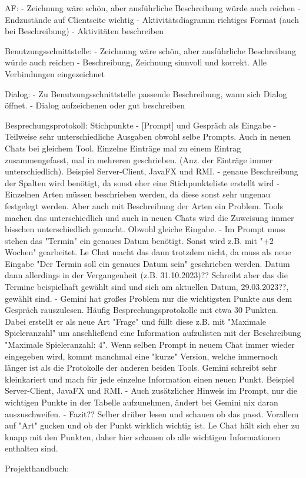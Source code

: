             AF:
            - Zeichnung wäre schön, aber ausführliche Beschreibung würde auch reichen
            - Endzustände auf Clientseite wichtig
            - Aktivitätsdiagramm richtiges Format (auch bei Beschreibung)
            - Aktivitäten beschreiben
        
            Benutzungsschnittstelle:
            - Zeichnung wäre schön, aber ausführliche Beschreibung würde auch reichen
            - Beschreibung, Zeichnung sinnvoll und korrekt. Alle Verbindungen eingezeichnet
        
            Dialog:
            - Zu Benutzungsschnittstelle passende Beschreibung, wann sich Dialog öffnet.
            - Dialog aufzeichenen oder gut beschreiben
    
    
    Besprechungsprotokoll:
        Stichpunkte
        - [Prompt] und Gespräch als Eingabe
        - Teilweise sehr unterschiedliche Ausgaben obwohl selbe Prompts. Auch in neuen Chats bei gleichem Tool.
        Einzelne Einträge mal zu einem Eintrag zusammengefasst, mal in mehreren geschrieben. (Anz. der Einträge immer unterschiedlich).
        Beispiel Server-Client, JavaFX und RMI.
        - genaue Beschreibung der Spalten wird benötigt, da sonst eher eine Stichpunkteliste erstellt wird
        - Einzelnen Arten müssen beschrieben werden, da diese sonst sehr ungenau festgelegt werden. Aber auch mit
        Beschreibung der Arten ein Problem. Tools machen das unterschiedlich und auch in neuen Chats wird die Zuweisung immer 
        bisschen unterschiedlich gemacht. Obwohl gleiche Eingabe.
        - Im Prompt muss stehen das "Termin" ein genaues Datum benötigt. Sonst wird z.B. mit "+2 Wochen" gearbeitet. Le Chat 
        macht das dann trotzdem nicht, da muss als neue Eingabe "Der Termin soll ein genaues Datum sein" geschrieben werden.
        Datum dann allerdings in der Vergangenheit (z.B. 31.10.2023)?? Schreibt aber das die Termine beispielhaft gewählt sind
        und sich am aktuellen Datum, 29.03.2023??, gewählt sind.
        - Gemini hat großes Problem nur die wichtigsten Punkte aus dem Gespräch rauszulesen. Häufig Besprechungsprotokolle mit etwa 
        30 Punkten. Dabei erstellt er als neue Art "Frage" und füllt diese z.B. mit "Maximale Spieleranzahl" um anschließend eine 
        Information aufzulisten mit der Beschreibung "Maximale Spieleranzahl: 4". Wenn selben Prompt in neuem Chat immer wieder 
        eingegeben wird, kommt manchmal eine "kurze" Version, welche immernoch länger ist als die Protokolle der anderen beiden Tools.
        Gemini schreibt sehr kleinkariert und mach für jede einzelne Information einen neuen Punkt. Beispiel Server-Client, JavaFX und RMI.
        - Auch zusätzlicher Hinweis im Prompt, nur die wichtigen Punkte in der Tabelle aufzunehmen, ändert bei Gemini nix daran auszuschweifen.
        - Fazit?? Selber drüber lesen und schauen ob das passt. Vorallem auf "Art" gucken und ob der Punkt wirklich wichtig ist. Le Chat
        hält sich eher zu knapp mit den Punkten, daher hier schauen ob alle wichtigen Informationen enthalten sind.

    Projekthandbuch:
